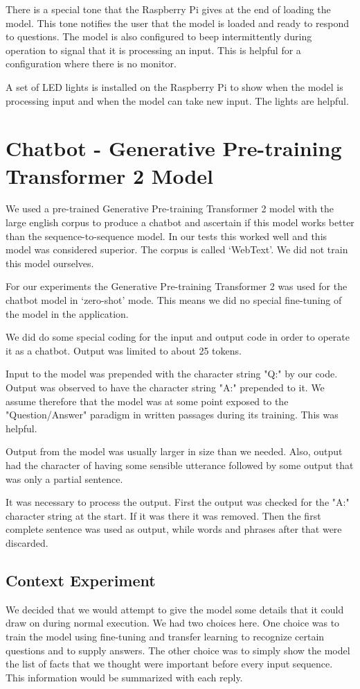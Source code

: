 There is a special tone that the Raspberry Pi gives at the end of loading the model. This tone notifies the user that the model is loaded and ready to respond to questions. The model is also configured to beep intermittently during operation to signal that it is processing an input. This is helpful for a configuration where there is no monitor.

A set of LED lights is installed on the Raspberry Pi to show when the model is processing input and when the model can take new input. The lights are helpful.


\section{Chatbot - Generative Pre-training Transformer 2 Model}
We used a pre-trained Generative Pre-training Transformer 2 model with the large english corpus to produce a chatbot and ascertain if this model works better than the sequence-to-sequence model. In our tests this worked well and this model was considered superior. The corpus is called `WebText'. We did not train this model ourselves.

For our experiments the Generative Pre-training Transformer 2 was used for the chatbot model in `zero-shot' mode. This means we did no special fine-tuning of the model in the application.

We did do some special coding for the input and output code in order to operate it as a chatbot. Output was limited to about 25 tokens. 

Input to the model was prepended with the character string "Q:" by our code. Output was observed to have the character string "A:" prepended to it. We assume therefore that the model was at some point exposed to the "Question/Answer" paradigm in written passages during its training. This was helpful.

Output from the model was usually larger in size than we needed. Also, output had the character of having some sensible utterance followed by some output that was only a partial sentence.

It was necessary to process the output. First the output was checked for the "A:" character string at the start. If it was there it was removed. Then the first complete sentence was used as output, while words and phrases after that were discarded.

\subsection{Context Experiment}
We decided that we would attempt to give the model some details that it could draw on during normal execution. We had two choices here. One choice was to train the model using fine-tuning and transfer learning to recognize certain questions and to supply answers. The other choice was to simply show the model the list of facts that we thought were important before every input sequence. This information would be summarized with each reply.

